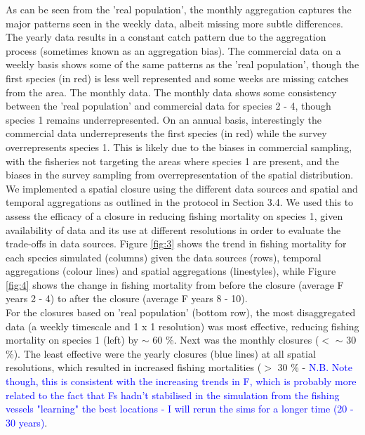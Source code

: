 \documentclass[review]{elsarticle}
\begin{document}
As can be seen from the 'real population', the monthly aggregation captures the
major patterns seen in the weekly data, albeit missing more subtle differences.
The yearly data results in a constant catch pattern due to the aggregation
process (sometimes known as an aggregation bias). The commercial data on a
weekly basis shows some of the same patterns as the 'real population', though
the first species (in red) is less well represented and some weeks are missing
catches from the area. The monthly data. The monthly data shows some
consistency between the 'real population' and commercial data for species 2 -
4, though species 1 remains underrepresented. On an annual basis, interestingly
the commercial data underrepresents the first species (in red) while the survey
overrepresents species 1. This is likely due to the biases in commercial
sampling, with the fisheries not targeting the areas where species 1 are
present, and the biases in the survey sampling from overrepresentation of the
spatial distribution. \\

We implemented a spatial closure using the different data sources and spatial
and temporal aggregations as outlined in the protocol in Section 3.4. We used
this to assess the efficacy of a closure in reducing fishing mortality on
species 1, given availability of data and its use at different resolutions in
order to evaluate the trade-offs in data sources. Figure \ref{fig:3} shows the
trend in fishing mortality for each species simulated (columns) given the data
sources (rows), temporal aggregations (colour lines) and spatial aggregations
(linestyles), while Figure \ref{fig:4} shows the change in fishing mortality
from before the closure (average F years 2 - 4) to after the closure (average F
years 8 - 10). \\

For the closures based on 'real population' (bottom row), the most
disaggregated data (a weekly timescale and 1 x 1 resolution) was most
effective, reducing fishing mortality on species 1 (left) by $\sim$ 60 \%. Next
was the monthly closures ($<$ $\sim$ 30 \%).  The least effective were the
yearly closures (blue lines) at all spatial resolutions, which resulted in
increased fishing mortalities ($>$ 30 \% - \textcolor{blue}{N.B. Note though,
this is consistent with the increasing trends in F, which is probably more
related to the fact that Fs hadn't stabilised in the simulation from the
fishing vessels "learning" the best locations - I will rerun the sims for a
longer time (20 - 30 years)}. \\
\end{document}
